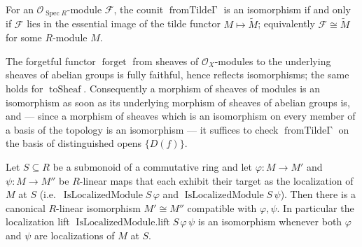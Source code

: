\begin{lemma}
  \label{mk-lem:isIso_fromTildeGamma_iff_mathlib}
  \mathlibok

  For an \(\mathcal{O}_{\operatorname{Spec} R}\)-module \(\mathcal{F}\), the counit
  \(\operatorname{fromTilde\Gamma}\) is an isomorphism if and only if \(\mathcal{F}\) lies in the
  essential image of the tilde functor \(M \mapsto \widetilde{M}\); equivalently
  \(\mathcal{F} \cong \widetilde{M}\) for some \(R\)-module \(M\).
\end{lemma}

\begin{lemma}
  \label{mk-lem:forget_reflectsIso_mathlib}
  \mathlibok

  The forgetful functor \(\operatorname{forget}\) from sheaves of \(\mathcal{O}_X\)-modules to the
  underlying sheaves of abelian groups is fully faithful, hence reflects isomorphisms; the same holds
  for \(\operatorname{toSheaf}\). Consequently a morphism of sheaves of modules is an isomorphism as
  soon as its underlying morphism of sheaves of abelian groups is, and — since a morphism of sheaves
  which is an isomorphism on every member of a basis of the topology is an isomorphism — it suffices
  to check \(\operatorname{fromTilde\Gamma}\) on the basis of distinguished opens \(\{D(f)\}\).
\end{lemma}

\begin{lemma}
  \label{mk-lem:isLocalizedModule_linearEquiv_mathlib}
  \mathlibok

  Let \(S \subseteq R\) be a submonoid of a commutative ring and let \(\varphi : M \to M'\) and
  \(\psi : M \to M''\) be \(R\)-linear maps that each exhibit their target as the localization of
  \(M\) at \(S\) (i.e.\ \(\operatorname{IsLocalizedModule} S\, \varphi\) and
  \(\operatorname{IsLocalizedModule} S\, \psi\)). Then there is a canonical \(R\)-linear isomorphism
  \(M' \cong M''\) compatible with \(\varphi, \psi\). In particular the localization lift
  \(\operatorname{IsLocalizedModule.lift} S\, \varphi\, \psi\) is an isomorphism whenever both
  \(\varphi\) and \(\psi\) are localizations of \(M\) at \(S\).
\end{lemma}

